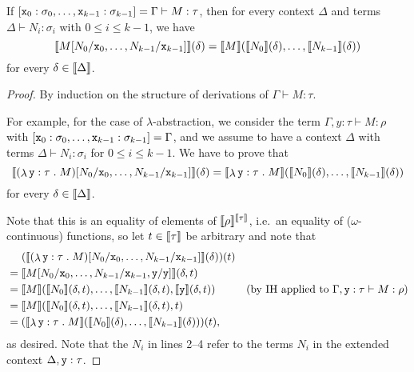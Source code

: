 \begin{lemma}\label{substitution-lemma}
  If
  \([\mathtt x_0 : \sigma_0,\dots,\mathtt x_{k-1} : \sigma_{k-1}] = \Gamma \vdash M :
  \tau\), then for every context \(\Delta\) and terms
  \(\Delta \vdash N_i : \sigma_i\) with \(0 \leq i \leq k-1\), we have
  \[
    \densem{M[N_0/\var x_0,\dots,N_{k-1}/\var x_{k-1}]}(\delta)
    =
    \densem{M}\pa*{\densem{N_0}(\delta),\dots,\densem{N_{k-1}}(\delta)}
  \]
  for every \(\delta \in \llbracket\Delta\rrbracket\).
\end{lemma}
\begin{proof}
  By induction on the structure of derivations of \(\Gamma \vdash M : \tau\).

  For example, for the case of \(\lambda\)-abstraction, we consider the term
  \(\Gamma,y : \tau \vdash M : \rho\) with
  \([\mathtt x_0 : \sigma_0,\dots,\mathtt x_{k-1} : \sigma_{k-1}] = \Gamma\), and we
  assume to have a context \(\Delta\) with terms
  \(\Delta \vdash N_i : \sigma_i\) for \(0 \leq i \leq k-1\).
  We have to prove that
  \[
    \densem*{\pa*{\lambdadot{\var y : \tau}{M}}[N_0/\var x_0 , \dots ,
      N_{k-1}/\var x_{k-1}]}(\delta) = \densem*{\lambdadot{\var y :
        \tau}{M}}\pa*{\densem{N_0}(\delta),\dots,\densem{N_{k-1}}(\delta)}
  \]
  for every \(\delta \in \llbracket\Delta\rrbracket\).

  Note that this is an equality of elements of
  \(\llbracket\rho\rrbracket^{\llbracket\tau\rrbracket}\), i.e.\ an equality of
  (\(\omega\)-continuous) functions, so let \(t \in \llbracket\tau\rrbracket\) be
  arbitrary and note that
  \begin{align*}
    &\hspace{13.5pt} \pa*{\densem*{\pa*{\lambdadot{\var y : \tau}{M}}[N_0/\var x_0 , \dots ,
    N_{k-1}/\var x_{k-1}]}(\delta)}(t) \\
    &= \densem*{M[N_0/\var x_0,\dots,N_{k-1}/\var x_{k-1},\var y/\var y]}(\delta,t) \\
    &= \densem*{M}\pa*{\densem{N_0}(\delta,t),\dots,\densem{N_{k-1}}(\delta,t),\densem{\var y}(\delta,t)}
    &\text{(by IH applied to \(\Gamma,\var y : \tau \vdash M : \rho\))} \\
    &= \densem*{M}\pa*{\densem{N_0}(\delta,t),\dots,\densem{N_{k-1}}(\delta,t),t} \\
    &= \pa*{\densem*{\lambdadot{\var y :
        \tau}{M}}\pa*{\densem{N_0}(\delta),\dots,\densem{N_{k-1}}(\delta)}}(t),
  \end{align*}
  as desired.
  Note that the \(N_i\) in lines 2--4 refer to the terms \(N_i\) in the extended
  context \(\Delta,\mathtt y : \tau\).
\end{proof}

